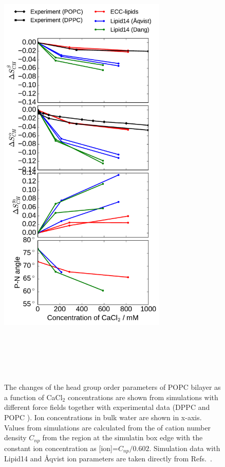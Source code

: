 \documentclass[aip,jcp,twocolumn]{revtex4}
\begin{document}
\begin{figure}[tbp]
  \centering
  \includegraphics[width=8.0cm]{../Fig/ipython_nb/PN_angle_OrdPars-A-B-g3_L14-ECCL17_q80_sig89_CaCl.pdf}
  \caption{\label{fig:delta_ordPar_CaCl}
    The changes of the head group order parameters of POPC bilayer as a function of CaCl$_2$ concentrations
    are shown from simulations with different force fields together with experimental data 
    (DPPC \cite{akutsu81} and POPC \cite{altenbach84}). 
    Ion concentrations in bulk water are shown in x-axis. 
    Values from simulations are calculated from the of cation number density $C_{np}$
    from the region at the simulatin box edge with the constant ion concentration as [ion]=$C_{np}/0.602$.
    Simulation data with Lipid14 and \AA{}qvist ion parameters are taken directly from
    Refs.~\cite{lipid14POPC0mMNaClfiles,lipid14POPC350mMCaClfiles,lipid14POPC350mMCaClfilesNC}.
  }
   \\
   \\
   \\
   \\
\end{figure}
\end{document}
